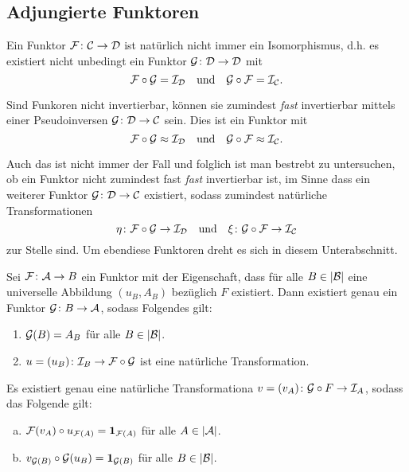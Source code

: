 \subsection{Adjungierte Funktoren}

Ein Funktor $\mathcal{F} \colon \mathcal{C} \to \mathcal{D}$ ist natürlich nicht immer ein Isomorphismus, d.h. es existiert nicht unbedingt ein Funktor $\mathcal{G} \colon \mathcal{D} \to \mathcal{D}$ mit
$$
\mathcal{F} \circ \mathcal{G} = \mathcal{I}_{\mathcal{D}} \quad\text{und}\quad \mathcal{G} \circ \mathcal{F} = \mathcal{I}_{\mathcal{C}}.
$$

Sind Funkoren nicht invertierbar, können sie zumindest \emph{fast} invertierbar mittels einer Pseudoinversen $\mathcal{G} \colon \mathcal{D} \to \mathcal{C}$ sein.
Dies ist ein Funktor mit 
$$\mathcal{F} \circ \mathcal{G} \approx \mathcal{I}_{\mathcal{D}} \quad\text{und}\quad \mathcal{G} \circ \mathcal{F} \approx \mathcal{I}_{\mathcal{C}}.$$

Auch das ist nicht immer der Fall und folglich ist man bestrebt zu untersuchen, ob ein Funktor nicht zumindest fast \emph{fast} invertierbar ist, im Sinne dass ein weiterer Funktor $\mathcal{G} \colon \mathcal{D} \to \mathcal{C}$ existiert, sodass zumindest natürliche Transformationen
$$
\eta \colon \mathcal{F} \circ \mathcal{G} \to \mathcal{I}_{\mathcal{D}} \quad\text{und}\quad \xi \colon \mathcal{G} \circ \mathcal{F} \to \mathcal{I}_{\mathcal{C}}
$$
zur Stelle sind.
Um ebendiese Funktoren dreht es sich in diesem Unterabschnitt.

\begin{thm}
  Sei $\mathcal{F} \colon \mathcal{A} \to B$ ein Funktor mit der Eigenschaft, dass für alle $B \in |\mathcal{B}|$ eine universelle Abbildung $(u_B, A_B)$ bezüglich $F$ existiert.
  Dann existiert genau ein Funktor $\mathcal{G} \colon B \to \mathcal{A}$, sodass Folgendes gilt:
  \begin{enumerate}[(1)]
    \item $\mathcal{G}(B) = A_B$ für alle $B \in |\mathcal{B}|$.
    \item $u = (u_B) \colon \mathcal{I}_B \to \mathcal{F} \circ \mathcal{G}$ ist eine natürliche Transformation.
  \end{enumerate}
\end{thm}

\begin{kor}
  Es existiert genau eine natürliche Transformationa $v = (v_A) \colon \mathcal{G} \circ F \to \mathcal{I}_A$, sodass das Folgende gilt:
  \begin{enumerate}[(a)]
    \item $\mathcal{F}(v_A) \circ u_{\mathcal{F}(A)} = \mathbf{1}_{\mathcal{F}(A)}$ für alle $A \in |\mathcal{A}|$.
    \item $v_{\mathcal{G}(B)} \circ \mathcal{G}(u_B) = \mathbf{1}_{\mathcal{G}(B)}$ für alle $B \in |\mathcal{B}|$.
  \end{enumerate}
\end{kor}

